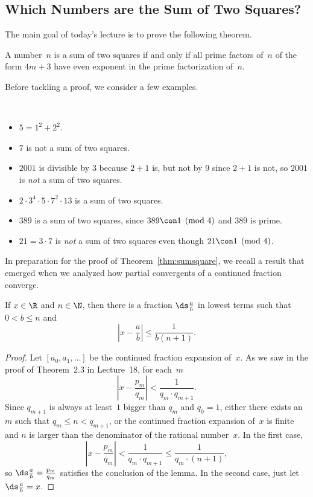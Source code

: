 \documentclass[11pt]{report}
\begin{document}
\subsection{Which Numbers are the Sum of Two Squares?}
The main goal of today's lecture is to prove the following theorem.
\begin{theorem}\label{thm:sumsquare}
  A number~$n$ is a sum of two squares if and only if all prime factors
  of~$n$ of the form $4m+3$ have even exponent in the prime factorization
  of~$n$.
\end{theorem}
Before tackling a proof, we consider a few examples.
\begin{example}\mbox{}\vspace{-3ex}\\
  \begin{itemize}
    \item $5 = 1^2 + 2^2$.
    \item $7$ is not a sum of two squares.
    \item $2001$ is divisible by $3$ because $2+1$ is, but not by $9$ since $2+1$ is not, so $2001$ is {\em not} a sum of two squares.
    \item $2\cdot 3^4\cdot 5\cdot 7^2\cdot 13$ is a sum of two squares.
    \item $389$ is a sum of two squares, since $389\con 1\pmod{4}$ and $389$ is prime.
    \item $21=3\cdot 7$ is {\em not} a sum of two squares even though $21\con 1\pmod{4}$.
  \end{itemize}
\end{example}

In preparation for the proof of Theorem~\ref{thm:sumsquare}, we recall a
result that emerged when we analyzed how  partial convergents
of a continued fraction converge.
\begin{lemma}\label{lem:approx}
  If $x\in\R$ and $n\in\N$, then there is a fraction $\ds\frac{a}{b}$
  in lowest terms such that $0<b\leq n$ and
  $$\left| x - \frac{a}{b} \right| \leq \frac{1}{b(n+1)}.$$
\end{lemma}
\begin{proof}
  Let $[a_0,a_1,\ldots]$ be the continued fraction expansion of~$x$.
  As we saw in the proof of Theorem~2.3 in Lecture~18, for each~$m$
  $$
    \left| x - \frac{p_m}{q_m}\right|
    < \frac{1}{q_m \cdot q_{m+1}}.
  $$
  Since $q_{m+1}$ is always at least~$1$ bigger than $q_m$ and $q_0=1$,
  either there exists an~$m$ such that $q_m\leq n < q_{m+1}$, or the
  continued fraction expansion of~$x$ is finite and $n$ is larger
  than the denominator of the rational number~$x$.  In the first
  case,
  $$
    \left| x - \frac{p_m}{q_m}\right|
    < \frac{1}{q_m \cdot q_{m+1}}
    \leq \frac{1}{q_m \cdot (n+1)},$$
  so $\ds\frac{a}{b} = \frac{p_m}{q_m}$ satisfies the conclusion of
  the lemma.   In the second case, just let $\ds\frac{a}{b} = x$.

\end{proof}
\end{document}
